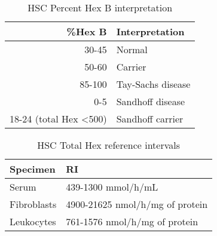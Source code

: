 \documentclass[12pt]{scrartcl}
\begin{document}
\begin{table}[htbp]
\caption{\label{tab:orgbeae564}HSC Percent Hex B interpretation}
\centering
\begin{tabular}{rl}
\%Hex B & Interpretation\\
\hline
30-45 & Normal\\
50-60 & Carrier\\
85-100 & Tay-Sachs disease\\
0-5 & Sandhoff disease\\
18-24 (total Hex <500) & Sandhoff carrier\\
\end{tabular}
\end{table}


\begin{table}[htbp]
\caption{\label{tab:org8332f10}HSC Total Hex reference intervals}
\centering
\begin{tabular}{ll}
Specimen & RI\\
\hline
Serum & 439-1300 mmol/h/mL\\
Fibroblasts & 4900-21625 nmol/h/mg of protein\\
Leukocytes & 761-1576 nmol/h/mg of protein\\
\end{tabular}
\end{table}
\end{document}
